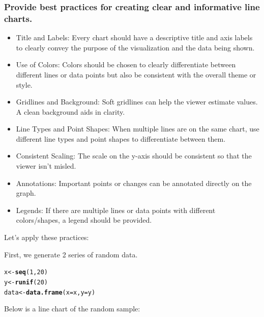 \documentclass{article}\usepackage[]{graphicx}\usepackage[]{xcolor}
\makeatletter
\newcommand{\hlnum}[1]{\textcolor[rgb]{0.686,0.059,0.569}{#1}}%
\newcommand{\hlstd}[1]{\textcolor[rgb]{0.345,0.345,0.345}{#1}}%
\newcommand{\hlkwb}[1]{\textcolor[rgb]{0.69,0.353,0.396}{#1}}%
\newcommand{\hlkwc}[1]{\textcolor[rgb]{0.333,0.667,0.333}{#1}}%
\newcommand{\hlkwd}[1]{\textcolor[rgb]{0.737,0.353,0.396}{\textbf{#1}}}%
\newenvironment{kframe}{%
 \def\at@end@of@kframe{}%
 \ifinner\ifhmode%
  \def\at@end@of@kframe{\end{minipage}}%
  \begin{minipage}{\columnwidth}%
 \fi\fi%
 \def\FrameCommand##1{\hskip\@totalleftmargin \hskip-\fboxsep
 \colorbox{shadecolor}{##1}\hskip-\fboxsep
     \hskip-\linewidth \hskip-\@totalleftmargin \hskip\columnwidth}%
 \MakeFramed {\advance\hsize-\width
   \@totalleftmargin\z@ \linewidth\hsize
   \@setminipage}}%
 {\par\unskip\endMakeFramed%
 \at@end@of@kframe}
\newenvironment{knitrout}{}{} %
\makeatother
\begin{document}
\subsubsection{Provide best practices for creating clear and informative line charts.}

\begin{itemize}
  \item Title and Labels: Every chart should have a descriptive title and axis labels to clearly convey the purpose of the visualization and the data being shown.
  \item Use of Colors: Colors should be chosen to clearly differentiate between different lines or data points but also be consistent with the overall theme or style.
  \item Gridlines and Background: Soft gridlines can help the viewer estimate values. A clean background aids in clarity.
  \item Line Types and Point Shapes: When multiple lines are on the same chart, use different line types and point shapes to differentiate between them.
  \item Consistent Scaling: The scale on the y-axis should be consistent so that the viewer isn't misled.
  \item Annotations: Important points or changes can be annotated directly on the graph.
  \item Legends: If there are multiple lines or data points with different colors/shapes, a legend should be provided.
\end{itemize}

Let's apply these practices:


First, we generate 2 series of random data.

\begin{knitrout}
\color{fgcolor}\begin{kframe}
\begin{alltt}
\hlstd{x} \hlkwb{<-} \hlkwd{seq}\hlstd{(}\hlnum{1}\hlstd{,} \hlnum{20}\hlstd{)}
\hlstd{y} \hlkwb{<-} \hlkwd{runif}\hlstd{(}\hlnum{20}\hlstd{)}
\hlstd{data} \hlkwb{<-} \hlkwd{data.frame}\hlstd{(}\hlkwc{x} \hlstd{= x,} \hlkwc{y} \hlstd{= y)}
\end{alltt}
\end{kframe}
\end{knitrout}

Below is a line chart of the random sample:
\end{document}
